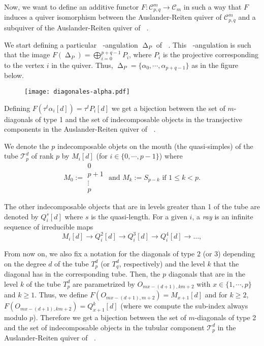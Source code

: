 \documentclass{amsart}
\theoremstyle{plain}
\theoremstyle{definition}
\begin{document}
Now, we want to define an additive functor $F : \mathcal{C}^m_{p,q} \rightarrow
\mathcal{C}_m$ in such a way that $F$ induces a quiver isomorphism between the Auslander-Reiten quiver of $\mathcal{C}^m_{p,q}$ and a subquiver of the Auslander-Reiten  quiver of ${\mathop{\mathcal{C}_m}\nolimits}$.

We start defining a particular  ${\mathop{(m+2)}\nolimits}$-angulation  ${\mathop{\Delta}\nolimits}_P$
of ${\mathop{P_{p,q,m}}\nolimits}$. This ${\mathop{(m+2)}\nolimits}$-angulation is such that the image
$F({\mathop{\Delta}\nolimits}_P)=\bigoplus_{i=0}^{p+q-1}P_i$,  where $P_i$ is the projective corresponding to the vertex $i$ in the quiver. Thus,  ${\mathop{\Delta}\nolimits}_P=\{\alpha_0, \cdots, \alpha_{p+q-1}\}$ as in the figure below.

\begin{figure}[H]
\begin{center}
\hspace*{0cm}\texttt{[image: diagonales-alpha.pdf]}
\end{center}
\end{figure}

Defining $F(\tau^t \alpha_i[d])=\tau^t P_i[d]$ we get a bijection between the set of $m$-diagonals of type 1 and the set of indecomposable objects in the transjective components in the Auslander-Reiten quiver of ${\mathop{\mathcal{C}_m}\nolimits}$.

 We denote the $p$  indecomposable objets on the mouth (the quasi-simples) of the tube $\mathcal{T}^d_p$ of rank $p$  by $M_i[d]$ (for $i\in \{0,\cdots, p-1\}$) where
$$M_0:=\begin{array}{c}  \scriptstyle{0} \\ \scriptstyle{p+1} \\ \scriptstyle{\vdots} \\ \scriptstyle{p} \end{array} \text{ \ \ \ \ \ \ \ and \ \ \ \ \ \ } M_k:=S_{p-k} \text { \ \  if \ \ } 1\leq k< p.$$

The other indecomposable objects that are in levels greater than 1 of the tube  are denoted by $Q_i^s[d]$  where  $s$ is the  quasi-length.  For a given $i$, a \emph{ray} is an infinite sequence of irreducible maps
 $$M_i[d] \rightarrow Q^2_i[d] \rightarrow Q^3_i[d] \rightarrow
Q^4_i[d] \rightarrow \hdots,$$

From now on, we also fix a notation for the diagonals of  type $2$ (or $3$) depending on the degree $d$ of the tube $T^d_p$ (or $T^d_q$, respectively) and the level $k$ that the diagonal has in the corresponding  tube. Then, the $p$  diagonals that are in the level  $k$ of the  tube $T^d_p$  are parametrized by $O_{mx-(d+1),km+2}$ with $x\in \{1,\cdots,p\}$ and $k\geq 1$.
Thus, we define $F(O_{mx-(d+1),m+2})=M_{x+1}[d]$ and for $k\geq 2$, $F(O_{mx-(d+1),km+2})= Q_{x+1}^{k}[d]$ (where we compute the sub-index always modulo $p$). Therefore we get a bijection between the set of $m$-diagonals of type 2 and the set of indecomposable objects in the tubular component $\mathcal{T}^d_p$ in the Auslander-Reiten quiver of ${\mathop{\mathcal{C}_m}\nolimits}$.
\end{document}
